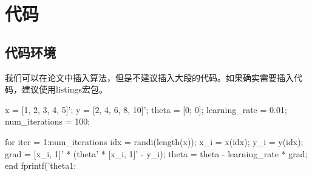 \chapter{代码}
\section{代码环境}
我们可以在论文中插入算法，但是不建议插入大段的代码。如果确实需要插入代码，建议使用listings宏包。
\begin{codeblock}[language=MATLAB]
x = [1, 2, 3, 4, 5]';
y = [2, 4, 6, 8, 10]';
theta = [0; 0];
learning_rate = 0.01;
num_iterations = 100;

for iter = 1:num_iterations
    idx = randi(length(x));
    x_i = x(idx);
    y_i = y(idx);
    grad = [x_i, 1]' * (theta' * [x_i, 1]' - y_i);
    theta = theta - learning_rate * grad;
end
fprintf('theta1: %
\end{codeblock}
